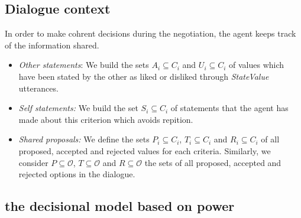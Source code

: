 \documentclass[runningheads,a4paper]{llncs}
\begin{document}
	\subsection{Dialogue context}
In order to make cohrent decisions during the negotiation, the agent keeps track of the information shared. 
\begin{itemize}
	\item \emph{Other statements}: We build the sets $A_i\subseteq C_i$ and $U_i\subseteq C_i$ of values which have been stated by the other as liked or disliked through \emph{StateValue} utterances.
	
	\item \emph{Self statements:} We build the set $S_i \subseteq C_i$ of statements that the agent has made about this criterion which avoids repition.
	
	\item \emph{Shared proposals:} We define the sets $P_i \subseteq C_i$, $T_i\subseteq C_i$ and $R_i\subseteq C_i$ of all proposed, accepted and rejected values for each criteria. Similarly, we consider $P\subseteq \mathcal{O}$, $T\subseteq \mathcal{O}$ and $R\subseteq \mathcal{O}$ the sets of all proposed, accepted and rejected options in the dialogue.
	
\end{itemize}



\subsection{the decisional model based on power}
\scriptsize{	
	
	}
\end{document}
